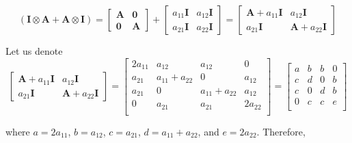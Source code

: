 \documentclass{article}
\begin{document}
\begin{equation}
(\mathbf{I} \otimes \mathbf{A} + \mathbf{A} \otimes \mathbf{I})=
\begin{bmatrix}
\mathbf{A} & \mathbf{0} \\
\mathbf{0} & \mathbf{A}
\end{bmatrix}+
\begin{bmatrix}
a_{11}\mathbf{I} & a_{12}\mathbf{I} \\
a_{21}\mathbf{I} & a_{22}\mathbf{I}
\end{bmatrix}=
\begin{bmatrix}
\mathbf{A}+a_{11}\mathbf{I} & a_{12}\mathbf{I} \\
a_{21}\mathbf{I} & \mathbf{A}+a_{22}\mathbf{I}
\end{bmatrix}
\end{equation}

Let us denote
\begin{equation}
\begin{bmatrix}
\mathbf{A}+a_{11}\mathbf{I} & a_{12}\mathbf{I} \\
a_{21}\mathbf{I} & \mathbf{A}+a_{22}\mathbf{I}
\end{bmatrix}=
\begin{bmatrix}
2a_{11} &a_{12} &a_{12} &0 \\
a_{21} &a_{11}+a_{22} &0 &a_{12} \\
a_{21} &0 &a_{11}+a_{22} &a_{12}\\
0 &a_{21} &a_{21} &2a_{22} \\
\end{bmatrix}=
\begin{bmatrix}
a &b &b &0 \\
c &d &0 &b \\
c &0 &d &b\\
0 &c &c &e \\
\end{bmatrix}
\end{equation}

where $a=2a_{11}$, $b=a_{12}$, $c=a_{21}$, $d=a_{11}+a_{22}$, and $e=2a_{22}$. Therefore,
\end{document}
